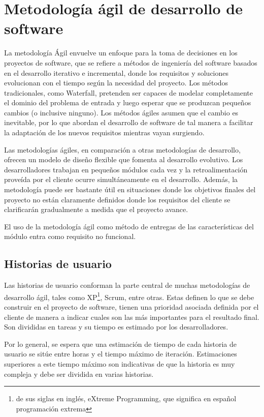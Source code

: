 \section{Metodología ágil de desarrollo de software}
La metodología Ágil envuelve un enfoque para la toma de decisiones en los proyectos de software, que se refiere a métodos de ingeniería del software basados en el desarrollo iterativo e incremental, donde los requisitos y soluciones evolucionan con el tiempo según la necesidad del proyecto. Los métodos tradicionales, como Waterfall, pretenden ser capaces de modelar completamente el dominio del problema de entrada y luego esperar que se produzcan pequeños cambios (o inclusive ninguno)\citep{davis_agile_2015}. Los métodos ágiles asumen que el cambio es inevitable, por lo que abordan el desarrollo de software de tal manera a facilitar la adaptación de los nuevos requisitos mientras vayan surgiendo.

Las metodologías ágiles, en comparación a otras metodologías de desarrollo, ofrecen un modelo de diseño flexible que fomenta al desarrollo evolutivo. Los desarrolladores trabajan en pequeños módulos cada vez y la retroalimentación proveída por el cliente ocurre simultáneamente en el desarrollo. Además, la metodología puede ser bastante útil en situaciones donde los objetivos finales del proyecto no están claramente definidos donde los requisitos del cliente se clarificarán gradualmente a medida que el proyecto avance.

El uso de la metodología ágil como método de entregas de las características del módulo entra como requisito no funcional.

\subsection{Historias de usuario}
Las historias de usuario conforman la parte central de muchas metodologías de desarrollo ágil, tales como XP\footnote{de sus siglas en inglés, eXtreme Programming, que significa en español programación extrema}, Scrum, entre otras. Estas definen lo que se debe construir en el proyecto de software, tienen una prioridad asociada definida por el cliente de manera a indicar cuales son las más importantes para el resultado final. Son divididas en tareas y su tiempo es estimado por los desarrolladores.

Por lo general, se espera que una estimación de tiempo de cada historia de usuario se sitúe entre horas y el tiempo máximo de iteración. Estimaciones superiores a este tiempo máximo son indicativas de que la historia es muy compleja y debe ser dividida en varias historias.

